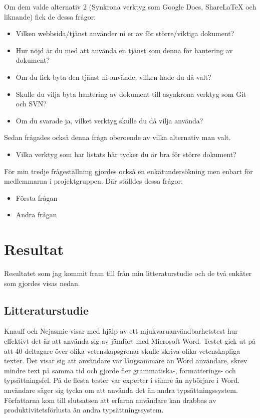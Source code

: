 Om dem valde alternativ 2 (Synkrona verktyg som Google Docs, ShareLaTeX och liknande) fick de dessa frågor:

\begin{itemize}
	\item Vilken webbsida/tjänst använder ni er av för större/viktiga dokument?
	\item Hur nöjd är du med att använda en tjänst som denna för hantering av dokument?
	\item Om du fick byta den tjänst ni använde, vilken hade du då valt?
	\item Skulle du vilja byta hantering av dokument till asynkrona verktyg som Git och SVN?
	\item Om du svarade ja, vilket verktyg skulle du då vilja använda?
\end{itemize}

Sedan frågades också denna fråga oberoende av vilka alternativ man valt.
\begin{itemize}
	\item Vilka verktyg som har listats här tycker du är bra för större dokument?
\end{itemize}



För min tredje frågeställning gjordes också en enkätundersökning men enbart för medlemmarna i projektgruppen. Där ställdes dessa frågor:
\begin{itemize}
	\item Första frågan
	\item Andra frågan
\end{itemize}

\section{Resultat}
\label{sec:results-tuhkala}
Resultatet som jag kommit fram till från min litteraturstudie och de två enkäter som gjordes visas nedan.

\subsection{Litteraturstudie}
Knauff och Nejasmic \cite{knauff2014efficiency} visar med hjälp av ett mjukvaruanvändbarhetstest hur effektivt det är att använda sig av \latex jämfört med Microsoft Word. Testet gick ut på att 40 deltagare över olika vetenskapsgrenar skulle skriva olika vetenskapliga texter.
Det visar sig att \latex användare var långsammare än Word användare, skrev mindre text på samma tid och gjorde fler grammatiska-, formatterings- och typsättningsfel. På de flesta tester var experter i \latex sämre än nybörjare i Word. \latex användare säger sig tycka om att använda det än andra typsättningssystem. Författarna kom till slutsatsen att erfarna \latex användare kan drabbas av produktivitetsförlusta än andra typsättningssystem.



